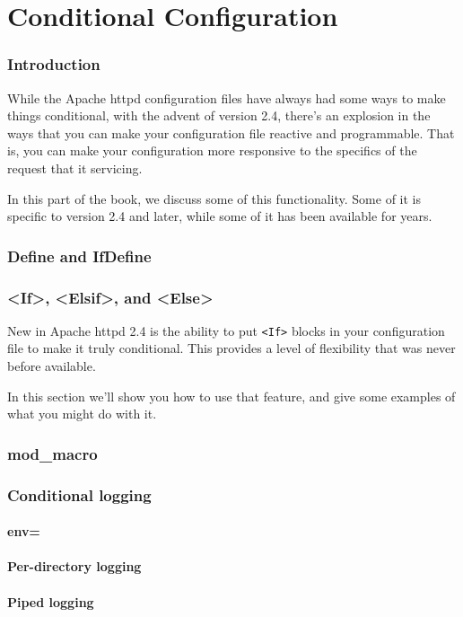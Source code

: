 \part{Conditional Configuration}

\section{Introduction}

While the Apache httpd configuration files have always had some ways to make things conditional, with the advent of version 2.4, there's an explosion in the ways that you can make your configuration file reactive and programmable. That is, you can make your configuration more responsive to the specifics of the request that it servicing.

In this part of the book, we discuss some of this functionality. Some of it is specific to version 2.4 and later, while some of it has been available for years.

\section{Define and IfDefine}

\section{<If>, <Elsif>, and <Else>}
\label{if}

New in Apache httpd 2.4 is the ability to put \verb~<If>~ blocks in your configuration file to make it truly conditional. This provides a level of flexibility that was never before available.

In this section we'll show you how to use that feature, and give some examples of what you might do with it.

\section{mod\_macro}

\section{Conditional logging}

\subsection{env=}

\subsection{Per-directory logging}

\subsection{Piped logging}

